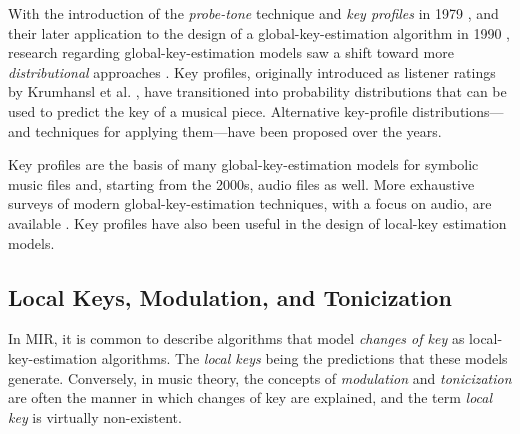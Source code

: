 \documentclass[sigconf]{acmart}
\begin{document}
With the introduction of the \emph{probe-tone} technique and \emph{key profiles} in 1979 \cite{krumhansl_quantification_1979}, and their later application to the design of a global-key-estimation algorithm in 1990 \cite{krumhansl_cognitive_1990}, research regarding global-key-estimation models saw a shift toward more \emph{distributional} approaches \cite{temperley2008pitch}. 
Key profiles, originally introduced as listener ratings by Krumhansl et al. \cite{krumhansl_quantification_1979, krumhansl_tracing_1982}, have transitioned into probability distributions that can be used to predict the key of a musical piece.
Alternative key-profile distributions---and techniques for applying them---have been proposed over the years.



Key profiles are the basis of many global-key-estimation models for symbolic music files and, starting from the 2000s, audio files as well. More exhaustive surveys of modern global-key-estimation techniques, with a focus on audio, are available \cite{korzeniowski_harmonic_2018, campbell_automatic_2010}. Key profiles have also been useful in the design of local-key estimation models.

\subsection{Local Keys, Modulation, and Tonicization}\label{ssec:terminology}

In MIR, it is common to describe algorithms that model \emph{changes of key} as local-key-estimation algorithms. 
The \emph{local keys} being the predictions that these models generate. Conversely, in music theory, the concepts of \emph{modulation} and \emph{tonicization} are often the manner in which changes of key are explained, and the term \emph{local key} is virtually non-existent.
\end{document}
